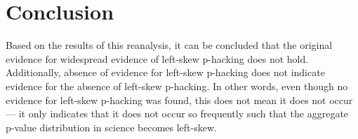 \section*{Conclusion}
Based on the results of this reanalysis, it can be concluded that the original evidence for widespread evidence of left-skew p-hacking \cite{Head_2015} does not hold. Additionally, absence of evidence for left-skew p-hacking does not indicate evidence for the absence of left-skew p-hacking. In other words, even though no evidence for left-skew p-hacking was found, this does not mean it does not occur --- it only indicates that it does not occur so frequently such that the aggregate p-value distribution in science becomes left-skew. 
  
  
  
  